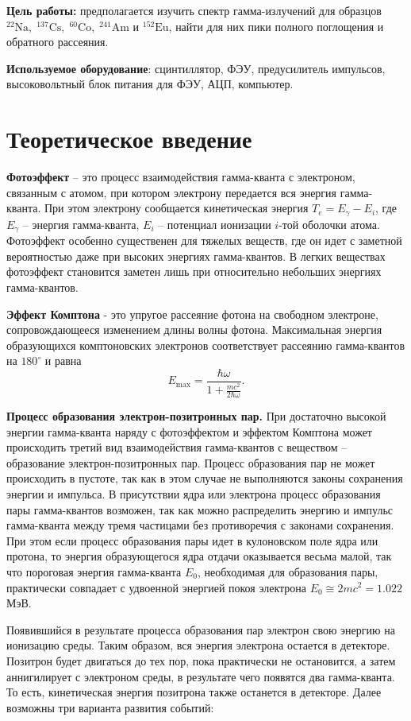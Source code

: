\textbf{Цель работы:} предполагается изучить спектр гамма-излучений для образцов $\mathrm{^{22}Na, \; ^{137}Cs, \; ^{60}Co, \; ^{241}Am}$ и $\mathrm{^{152}Eu}$, найти для них пики полного поглощения и обратного рассеяния.

\textbf{Используемое оборудование}: сцинтиллятор, ФЭУ, предусилитель импульсов, высоковольтный блок питания для ФЭУ, АЦП, компьютер.
             
\section{Теоретическое введение}

    \textbf{Фотоэффект} -- это процесс взаимодействия гамма-кванта с электроном, связанным с атомом, при котором электрону передается вся энергия гамма-кванта. При этом электрону сообщается кинетическая энергия $T_e = E_\gamma - E_i$, где $E_\gamma$ -- энергия гамма-кванта, $E_i$ -- потенциал ионизации $i$-той оболочки атома. Фотоэффект особенно существенен для тяжелых веществ, где он идет с заметной вероятностью даже при высоких энергиях гамма-квантов. В легких веществах фотоэффект становится заметен лишь при относительно небольших энергиях гамма-квантов.

    \textbf{Эффект Комптона} - это упругое рассеяние фотона на свободном электроне, сопровождающееся изменением длины волны фотона. Максимальная энергия образующихся комптоновских электронов соответствует рассеянию гамма-квантов на $180^\circ$ и равна
    \begin{equation}
        E_{\max}=\frac{\hbar\omega}{1+\frac{mc^2}{2\hbar\omega}}.
    \end{equation}

    \textbf{Процесс образования электрон-позитронных пар.}
    При достаточно высокой энергии гамма-кванта наряду с фотоэффектом и эффектом Комптона может происходить третий вид взаимодействия гамма-квантов с веществом -- образование электрон-позитронных пар. Процесс образования пар не может происходить в пустоте, так как в этом случае не выполняются законы сохранения энергии и импульса. В присутствии ядра или электрона процесс образования пары гамма-квантов возможен, так как можно распределить энергию и импульс гамма-кванта между тремя частицами без противоречия с законами сохранения. При этом если процесс образования пары идет в кулоновском поле ядра или протона, то энергия образующегося ядра отдачи оказывается весьма малой, так что пороговая энергия гамма-кванта $E_0$, необходимая для образования пары, практически совпадает с удвоенной энергией покоя электрона $E_0\cong 2mc^2=1.022$ МэВ.\par
    Появившийся в результате процесса образования пар электрон свою энергию на ионизацию среды. Таким образом, вся энергия электрона остается в детекторе. Позитрон будет двигаться до тех пор, пока практически не остановится, а затем аннигилирует с электроном среды, в результате чего появятся два гамма-кванта. То есть, кинетическая энергия позитрона также останется в детекторе. Далее возможны три варианта развития событий:

